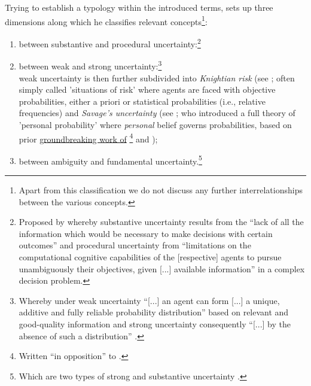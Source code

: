 \documentclass[a4paper,12pt,oneside,pointednumbers,bibtotoc,bigheadings,liststotoc]{scrbook}
\begin{document}
\\
\\
Trying to establish a typology within the introduced terms, \citet{dequech:14}  sets up three dimensions along which he classifies relevant concepts\footnote{Apart from this classification we do not discuss any further interrelationships between the various concepts.}: 
\begin{enumerate}
	\item between substantive and procedural uncertainty:\footnote{Proposed by \citet[p. 145]{dosiandegidi:91} whereby substantive uncertainty results from the ``lack of all the information which would be necessary to make decisions with certain outcomes'' and procedural uncertainty from ``limitations on the computational cognitive capabilities of the [respective] agents to pursue unambiguously their objectives, given [...] available information'' in a complex decision problem. }
	\item between weak and strong uncertainty:\footnote{Whereby under weak uncertainty ``[...] an agent can form [...] a unique, additive and fully reliable probability distribution'' based on relevant and good-quality information and strong uncertainty consequently ``[...] by the absence of such a distribution'' \citep[p. 622/623]{dequech:14}.} \\
	weak uncertainty is then further subdivided into \textit{Knightian risk} (see \citet{knight:21}; often simply called 'situations of risk' where agents are faced with objective probabilities, either a priori or statistical probabilities (i.e., relative frequencies) and \textit{Savage's uncertainty} (see \citet{savage:54}; who introduced a full theory of 'personal probability' where \textit{personal} belief governs probabilities, based on prior \href{https://archive.org/stream/in.ernet.dli.2015.223806/2015.223806.The-Foundations#page/n289/mode/2up}{groundbreaking work of} \href{http://www.brunodefinetti.it/Link/Subjective%20Expected%20Utility%20-%20Intro.htm}{\citet{ramsey:26}\footnote{Written ``in opposition'' to \citet{keynes:21}.} and \citet{finetti:37}});
	\item between ambiguity and fundamental uncertainty.\footnote{Which are two types of strong and substantive uncertainty \citep{dequesh:00}.}
\end{enumerate}
\vspace{1cm}
\end{document}
